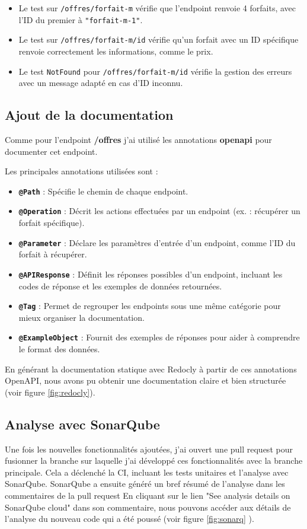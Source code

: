 \documentclass{article}
\begin{document}
	\begin{itemize}
		\item Le test sur \texttt{/offres/forfait-m} vérifie que l'endpoint renvoie 4 forfaits, avec l'ID du premier à \texttt{"forfait-m-1"}.
		\item Le test sur \texttt{/offres/forfait-m/{id}} vérifie qu'un forfait avec un ID spécifique renvoie correctement les informations, comme le prix.
		\item Le test \texttt{NotFound} pour \texttt{/offres/forfait-m/{id}} vérifie la gestion des erreurs avec un message adapté en cas d'ID inconnu.
	\end{itemize}

	\subsection{Ajout de la documentation}
	\label{subsec:doc}
	
	Comme pour l'endpoint \textbf{/offres} j'ai utilisé les annotations \textbf{openapi} pour documenter cet endpoint.
	
	Les principales annotations utilisées sont :
	
	\begin{itemize}
		\item \textbf{\texttt{@Path}} : Spécifie le chemin de chaque endpoint.
		\item \textbf{\texttt{@Operation}} : Décrit les actions effectuées par un endpoint (ex. : récupérer un forfait spécifique).
		\item \textbf{\texttt{@Parameter}} : Déclare les paramètres d'entrée d'un endpoint, comme l'ID du forfait à récupérer.
		\item \textbf{\texttt{@APIResponse}} : Définit les réponses possibles d'un endpoint, incluant les codes de réponse et les exemples de données retournées.
		\item \textbf{\texttt{@Tag}} : Permet de regrouper les endpoints sous une même catégorie pour mieux organiser la documentation.
		\item \textbf{\texttt{@ExampleObject}} : Fournit des exemples de réponses pour aider à comprendre le format des données.
	\end{itemize}
	
	En générant la documentation statique avec Redocly à partir de ces annotations OpenAPI, nous avons pu obtenir une documentation claire et bien structurée (voir figure \ref{fig:redocly}).
	
	\subsection{Analyse avec SonarQube}
	\label{analyse:sonar}
	Une fois les nouvelles fonctionnalités ajoutées, j'ai ouvert une pull request pour fusionner la branche sur laquelle j'ai développé ces fonctionnalités avec la branche principale. Cela a déclenché la CI, incluant les tests unitaires et l'analyse avec SonarQube. SonarQube a ensuite généré un bref résumé de l'analyse dans les commentaires de la pull request
	En cliquant sur le lien "See analysis details on SonarQube cloud" dans son commentaire, nous pouvons accéder aux détails de l'analyse du nouveau code qui a été poussé (voir figure \ref{fig:sonarq} ). 
	
\end{document}
